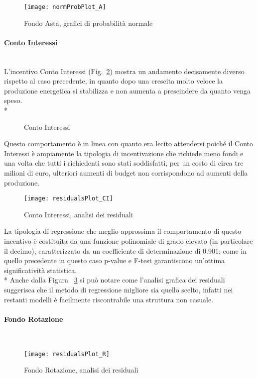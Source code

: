 \documentclass[12pt,a4paper,openright,twoside]{report}
\newcommand{\myparagraph}[1]{\paragraph{#1}\mbox{}\\}
\begin{document}
\begin{figure}[H]
	\centering
	\texttt{[image: normProbPlot\_A]}
	\caption{Fondo Asta, grafici di probabilità normale}
	\label{normProbPlot_A}
\end{figure}

\myparagraph{Conto Interessi}

L'incentivo Conto Interessi (Fig.~\ref{graphSimCI}) mostra un andamento decisamente diverso rispetto al caso precedente, in quanto dopo una crescita molto veloce la produzione energetica si stabilizza e non aumenta a prescindere da quanto venga speso. \\* 

\begin{figure}[H]
	\centering
	\qquad
	\caption{Conto Interessi}
	\label{graphSimCI}
\end{figure}

Questo comportamento è in linea con quanto era lecito attendersi poiché il Conto Interessi è ampiamente la tipologia di incentivazione che richiede meno fondi e una volta che tutti i richiedenti sono stati soddisfatti, per un costo di circa tre milioni di euro, ulteriori aumenti di budget non corrispondono ad aumenti della produzione.

\begin{figure}[hbt]
	\centering
	\texttt{[image: residualsPlot\_CI]}
	\caption{Conto Interessi, analisi dei residuali}
	\label{residualsPlot_CI}
\end{figure}

La tipologia di regressione che meglio approssima il comportamento di questo incentivo è costituita da una funzione polinomiale di grado elevato (in particolare il decimo), caratterizzato da un coefficiente di determinazione di 0.901; come in quello precedente in questo caso p-value e F-test garantiscono un'ottima significatività statistica.\\* 
Anche dalla Figura ~\ref{residualsPlot_CI} si può notare come l'analisi grafica dei residuali suggerisca che il metodo di regressione migliore sia quello scelto, infatti nei restanti modelli è facilmente riscontrabile una struttura non casuale.

\myparagraph{Fondo Rotazione}

\begin{figure}[hbt]
	\centering
	\texttt{[image: residualsPlot\_R]}
	\caption{Fondo Rotazione, analisi dei residuali}
	\label{residualsPlot_R}
\end{figure}
\end{document}
